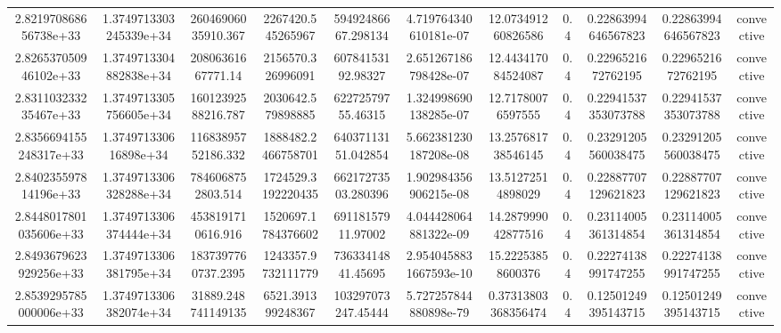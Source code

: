 \begin{table}
\begin{tabular}{ccccccccccc}
2.821970868656738e+33 & 1.3749713303245339e+34 & 26046906035910.367 & 2267420.545265967 & 59492486667.298134 & 4.719764340610181e-07 & 12.073491260826586 & 0.4 & 0.22863994646567823 & 0.22863994646567823 & convective \\
2.826537050946102e+33 & 1.3749713304882838e+34 & 20806361667771.14 & 2156570.326996091 & 60784153192.98327 & 2.651267186798428e-07 & 12.443417084524087 & 0.4 & 0.2296521672762195 & 0.2296521672762195 & convective \\
2.831103233235467e+33 & 1.3749713305756605e+34 & 16012392588216.787 & 2030642.579898885 & 62272579755.46315 & 1.324998690138285e-07 & 12.71780076597555 & 0.4 & 0.22941537353073788 & 0.22941537353073788 & convective \\
2.8356694155248317e+33 & 1.374971330616898e+34 & 11683895752186.332 & 1888482.2466758701 & 64037113151.042854 & 5.662381230187208e-08 & 13.257681738546145 & 0.4 & 0.23291205560038475 & 0.23291205560038475 & convective \\
2.840235597814196e+33 & 1.3749713306328288e+34 & 7846068752803.514 & 1724529.3192220435 & 66217273503.280396 & 1.902984356906215e-08 & 13.51272514898029 & 0.4 & 0.22887707129621823 & 0.22887707129621823 & convective \\
2.8448017801035606e+33 & 1.3749713306374444e+34 & 4538191710616.916 & 1520697.1784376602 & 69118157911.97002 & 4.044428064881322e-09 & 14.287999042877516 & 0.4 & 0.23114005361314854 & 0.23114005361314854 & convective \\
2.8493679623929256e+33 & 1.3749713306381795e+34 & 1837397760737.2395 & 1243357.9732111779 & 73633414841.45695 & 2.9540458831667593e-10 & 15.22253858600376 & 0.4 & 0.22274138991747255 & 0.22274138991747255 & convective \\
2.8539295785000006e+33 & 1.3749713306382074e+34 & 31889.248741149135 & 6521.391399248367 & 103297073247.45444 & 5.727257844880898e-79 & 0.37313803368356474 & 0.4 & 0.12501249395143715 & 0.12501249395143715 & convective \\
\end{tabular}
\end{table}
